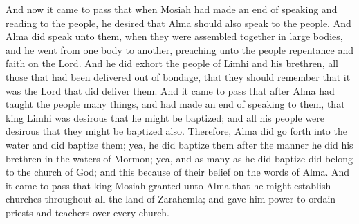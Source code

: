 And now it came to pass that when Mosiah had made an end of speaking and reading to the people, he desired that Alma should also speak to the people.
\bverse \iffalse And Alma did speak unto them, when they were assembled together in large bodies, and he went from one body to another, preaching unto the people repentance and faith on the Lord. \fi
And Alma did speak unto them, when they were assembled together in large bodies, and he went from one body to another, preaching unto the people repentance and faith on the Lord.
\bverse \iffalse And he did exhort the people of Limhi and his brethren, all those that had been delivered out of bondage, that they should remember that it was the Lord that did deliver them. \fi
And he did exhort the people of Limhi and his brethren, all those that had been delivered out of bondage, that they should remember that it was the Lord that did deliver them.
\bverse \iffalse And it came to pass that after Alma had taught the people many things, and had made an end of speaking to them, that king Limhi was desirous that he might be baptized; and all his people were desirous that they might be baptized also. \fi
And it came to pass that after Alma had taught the people many things, and had made an end of speaking to them, that king Limhi was desirous that he might be baptized; and all his people were desirous that they might be baptized also.
\bverse \iffalse Therefore, Alma did go forth into the water and did baptize them; yea, he did baptize them after the manner he did his brethren in the waters of Mormon; yea, and as many as he did baptize did belong to the church of God; and this because of their belief on the words of Alma. \fi
Therefore, Alma did go forth into the water and did baptize them; yea, he did baptize them after the manner he did his brethren in the waters of Mormon; yea, and as many as he did baptize did belong to the church of God; and this because of their belief on the words of Alma.
\bverse \iffalse And it came to pass that king Mosiah granted unto Alma that he might establish churches throughout all the land of Zarahemla; and gave him power to ordain priests and teachers over every church. \fi
And it came to pass that king Mosiah granted unto Alma that he might establish churches throughout all the land of Zarahemla; and gave him power to ordain priests and teachers over every church.
\bverse \iffalse Now this was done because there were so many people that they could not all be governed by one teacher; neither could they all hear the word of God in one assembly; \fi
